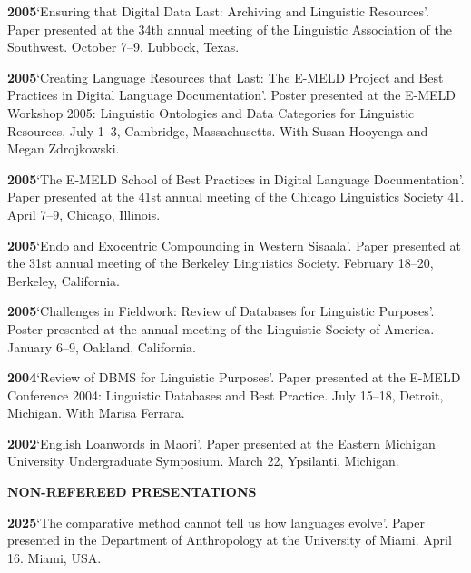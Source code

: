 \documentclass[11pt]{article}
\newcommand{\hangpara}{
 \setlength{\parindent}{0in} %
 \hangindent=0.42in %
}
\begin{document}
\vskip 6pt
\hangpara
{\bf 2005}\hspace{1ex}`Ensuring that Digital Data Last: Archiving and Linguistic Resources'. Paper presented at the 34th annual meeting of the Linguistic Association of the Southwest. October 7--9, Lubbock, Texas. 
 
\vskip 6pt
\hangpara
{\bf 2005}\hspace{1ex}`Creating Language Resources that Last: The E-MELD Project and Best Practices in Digital Language Documentation'. Poster presented at the E-MELD Workshop 2005: Linguistic Ontologies and Data Categories for Linguistic Resources, July 1--3, Cambridge, Massachusetts. With Susan Hooyenga and Megan Zdrojkowski.

\vskip 6pt
\hangpara
{\bf 2005}\hspace{1ex}`The E-MELD School of Best Practices in Digital Language Documentation'. Paper presented at the 41st annual meeting of the Chicago Linguistics Society 41. April 7--9, Chicago, Illinois.

\vskip 6pt
\hangpara
{\bf 2005}\hspace{1ex}`Endo and Exocentric Compounding in Western Sisaala'. Paper presented at the 31st annual meeting of the Berkeley Linguistics Society. February 18--20, Berkeley, California.

\vskip 6pt
\hangpara
{\bf 2005}\hspace{1ex}`Challenges in Fieldwork: Review of Databases for Linguistic Purposes'. Poster presented at the annual meeting of the Linguistic Society of America. January 6--9, Oakland, California.

\vskip 6pt
\hangpara
{\bf 2004}\hspace{1ex}`Review of DBMS for Linguistic Purposes'. Paper presented at the E-MELD Conference 2004: Linguistic Databases and Best Practice. July 15--18, Detroit, Michigan. With Marisa Ferrara.

\vskip 6pt
\hangpara
{\bf 2002}\hspace{1ex}`English Loanwords in Maori'. Paper presented at the Eastern Michigan University Undergraduate Symposium. March 22, Ypsilanti, Michigan.


\vskip 20pt
\begin{flushleft}
{\bf NON-REFEREED PRESENTATIONS}
\end{flushleft}

\hangpara
{\bf 2025}\hspace{1ex}`The comparative method cannot tell us how languages evolve'. Paper presented in the Department of Anthropology at the University of Miami. April 16. Miami, USA.
\end{document}

